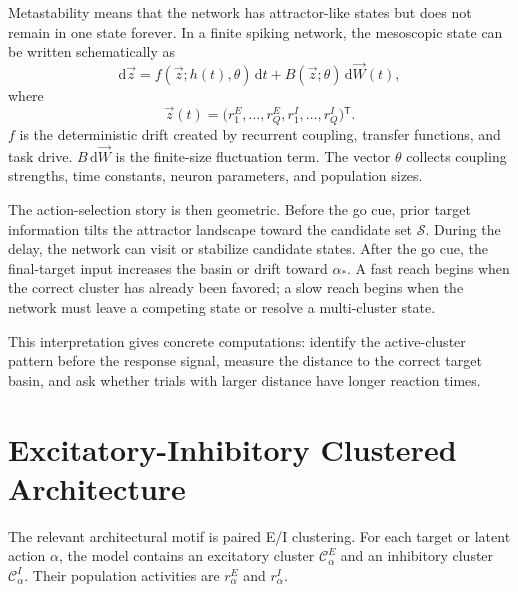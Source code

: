 Metastability means that the network has attractor-like states but does not remain in one state forever. In a finite spiking network, the mesoscopic state can be written schematically as
%
\begin{equation}
  \mathrm{d}\vec z
  =
  f(\vec z;h(t),\theta)\,\mathrm{d}t
  +
  B(\vec z;\theta)\,\mathrm{d}\vec W(t),
  \label{eq:rostami-mesoscopic-sde-schematic}
\end{equation}
%
where
%
\begin{equation}
  \vec z(t)=
  \bigl(
    r_1^E,\ldots,r_Q^E,
    r_1^I,\ldots,r_Q^I
  \bigr){}^{\mathsf T}.
  \label{eq:rostami-state-vector}
\end{equation}
%
$f$ is the deterministic drift created by recurrent coupling, transfer functions, and task drive. $B\,\mathrm{d}\vec W$ is the finite-size fluctuation term. The vector $\theta$ collects coupling strengths, time constants, neuron parameters, and population sizes.

The action-selection story is then geometric. Before the go cue, prior target information tilts the attractor landscape toward the candidate set $\mathcal{S}$. During the delay, the network can visit or stabilize candidate states. After the go cue, the final-target input increases the basin or drift toward $\alpha_*$. A fast reach begins when the correct cluster has already been favored; a slow reach begins when the network must leave a competing state or resolve a multi-cluster state.

This interpretation gives concrete computations: identify the active-cluster pattern before the response signal, measure the distance to the correct target basin, and ask whether trials with larger distance have longer reaction times.

\section{Excitatory-Inhibitory Clustered Architecture}
\label{sec:rostami-ei-clustered-architecture}

The relevant architectural motif is paired E/I clustering. For each target or latent action $\alpha$, the model contains an excitatory cluster $\mathcal{C}_{\alpha}^{E}$ and an inhibitory cluster $\mathcal{C}_{\alpha}^{I}$. Their population activities are $r_{\alpha}^{E}$ and $r_{\alpha}^{I}$.

